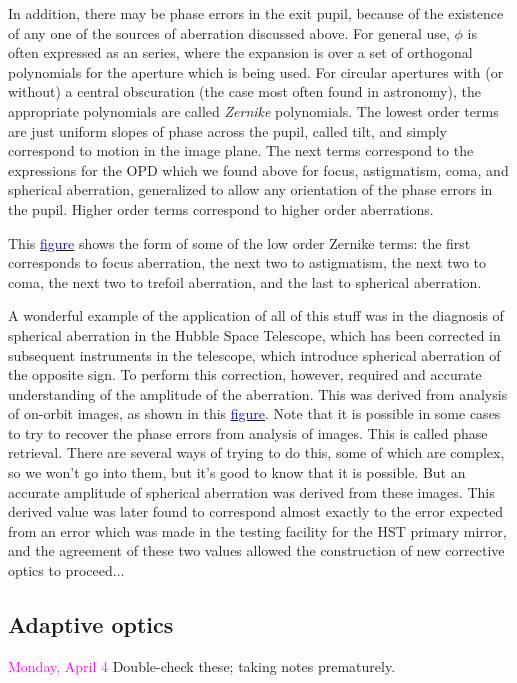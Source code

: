 \documentclass[12pt]{article}
\begin{document}
In addition, there may be phase errors in the exit pupil, because of
the existence of any one of the sources of aberration discussed
above. For general use, $\phi$ is often expressed as an series,
where the expansion is over a set of orthogonal polynomials for the
aperture which is being used. For circular apertures with (or
without) a central obscuration (the case most often found in
astronomy), the appropriate polynomials are called \emph{Zernike}
polynomials. The lowest order terms are just uniform slopes of phase
across the pupil, called tilt, and simply correspond to motion in the
image plane. The next terms correspond to the expressions for the OPD
which we found above for focus, astigmatism, coma, and spherical
aberration, generalized to allow any orientation of the phase errors
in the pupil. Higher order terms correspond to higher order
aberrations.

This \href{http://astronomy.nmsu.edu/holtz/a535/html/diagrams/a535/zernike.htm}
{\textcolor{blue}{figure}} shows the form of some of the low order Zernike terms:
the first corresponds to focus aberration, the next two to
astigmatism, the next two to coma, the next two to trefoil
aberration, and the last to spherical aberration.

A wonderful example of the application of all of this stuff was in the
diagnosis of spherical aberration in the Hubble Space Telescope, which
has been corrected in subsequent instruments in the telescope, which
introduce spherical aberration of the opposite sign. To perform this
correction, however, required and accurate understanding of the
amplitude of the aberration. This was derived from analysis of
on-orbit images, as shown in this
\href{http://astronomy.nmsu.edu/holtz/a535/html/diagrams/a535/hstspher.htm}
{\textcolor{blue}{figure}}. Note that it is possible in
some cases to try to recover the phase errors from analysis of images.
This is called phase retrieval. There are several ways of trying to do
this, some of which are complex, so we won't go into them, but it's
good to know that it is possible. But an accurate amplitude of
spherical aberration was derived from these images. This derived value
was later found to correspond almost exactly to the error expected
from an error which was made in the testing facility for the HST
primary mirror, and the agreement of these two values allowed the
construction of new corrective optics to proceed$\ldots$

\subsection*{Adaptive optics}
\textcolor{magenta}{Monday, April 4}
Double-check these; taking notes prematurely.
\end{document}
